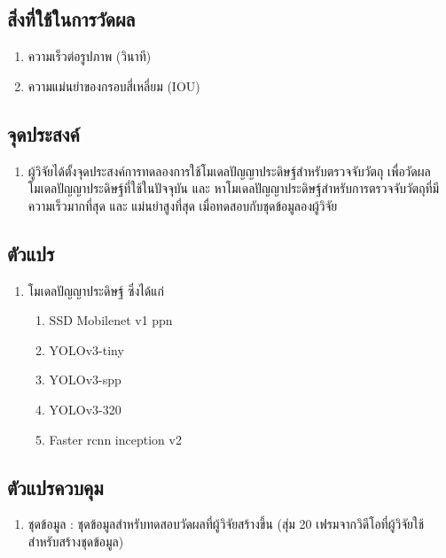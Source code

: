 \subsection*{สิ่งที่ใช้ในการวัดผล}
	\begin{enumerate}
		\item ความเร็วต่อรูปภาพ (วินาที)
		\item ความแม่นยำของกรอบสี่เหลี่ยม (IOU)
	\end{enumerate}
\subsection*{จุดประสงค์}
	\begin{enumerate}
		\item ผู้วิจัยได้ตั้งจุดประสงค์การทดลองการใช้โมเดลปัญญาประดิษฐ์สำหรับตรวจจับวัตถุ เพื่อวัดผลโมเดลปัญญาประดิษฐ์ที่ใช้ในปัจจุบัน
และ หาโมเดลปัญญาประดิษฐ์สำหรับการตรวจจับวัตถุที่มีความเร็วมากที่สุด และ แม่นยำสูงที่สุด เมื่อทดสอบกับชุดข้อมูลองผู้วิจัย
	\end{enumerate}
\subsection*{ตัวแปร}
	\begin{enumerate}
		\item โมเดลปัญญาประดิษฐ์ ซึ่งได้แก่
		\begin{enumerate}
			\item SSD Mobilenet v1 ppn
			\item YOLOv3-tiny
			\item YOLOv3-spp	
			\item YOLOv3-320
			\item Faster rcnn inception v2
		\end{enumerate}
	\end{enumerate}
\subsection*{ตัวแปรควบคุม}
	\begin{enumerate}
		\item ชุดข้อมูล : ชุดข้อมูลสำหรับทดสอบวัดผลที่ผู้วิจัยสร้างขึ้น (สุ่ม 20 เฟรมจากวิดีโอที่ผู้วิจัยใช้สำหรับสร้างชุดข้อมูล)
	\end{enumerate}
